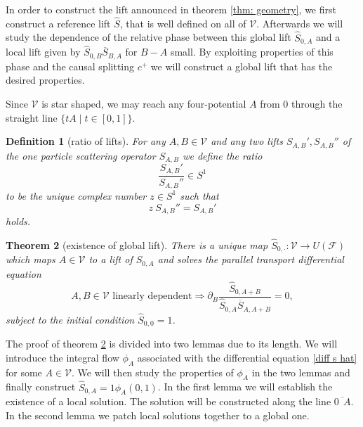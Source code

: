 \documentclass[b5paper,draft,openbib,12pt]{memoir}
\newtheorem{Def}{Definition}
\newtheorem{Thm}[Def]{Theorem}
\begin{document}
In order to construct the lift announced in theorem \ref{thm: geometry}, we first construct a reference lift \(\hat{S}\), that is well defined on all of \(\mathcal{V}\). 
Afterwards we will study the dependence of the relative phase between 
this global lift \(\hat{S}_{0,A}\) and a local lift given by \(\hat{S}_{0,B}\overline{S}_{B,A}\) for \(B-A\) small. 
By exploiting properties of this phase and the causal splitting \(c^+\) we will construct a global lift that has the desired properties.

Since \(\mathcal{V}\) is star shaped, we may reach any four-potential \(A\) from \(0\) through the straight line
\(\{t A\mid t \in [0,1]\}\). 

\begin{Def}[ratio of lifts]\label{def:ratio}
For any  \(A,B\in\mathcal{V}\) and any two lifts \(S_{A,B}', S_{A,B}''\) of the one particle scattering operator \(S_{A,B}\)
we define the ratio
\begin{equation}
\frac{S_{A,B}'}{S_{A,B}''}\in S^1
\end{equation}
to be the unique complex number \(z\in S^1\) such that 
\begin{equation}
z ~S_{A,B}'' = S_{A,B}'
\end{equation}
holds.
\end{Def}

\begin{Thm}[existence of global lift]\label{thm: ex s hat}
  There is a unique map \(\hat{S}_{0,\cdot}:\mathcal{V}\to U(\mathcal{F})\) 
    which maps  \(A\in\mathcal{V}\) to a lift of \(S_{0,A}\) and solves the 
    parallel transport differential equation
  \begin{equation}\label{diff s hat}
A,B\in\mathcal{V}\text{ linearly dependent}\Rightarrow \partial_B \frac{\hat{S}_{0,A+B}}{\hat{S}_{0,A}\overline{S}_{A,A+B}}=0,
\end{equation}
subject to the initial condition \(\hat{S}_{0,0}=1\).
\end{Thm}

The proof of theorem \ref{thm: ex s hat} is divided into two lemmas due to its length. We will introduce the integral flow \(\phi_A\) associated 
with the differential equation \eqref{diff s hat} for some \(A\in\mathcal{V}\). We will then study the properties of \(\phi_A\)
in the two lemmas and finally construct \(\hat{S}_{0,A}=1 \phi_A(0,1)\). In the first lemma we will establish the existence of a 
local solution. The solution will be constructed along the line \(\overline{0 ~~ A}\). In the second lemma we patch local solutions together
to a global one.
\end{document}
